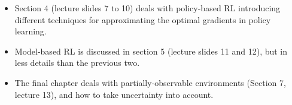 \begin{itemize}
	\item Section 4 (lecture slides 7 to 10) deals with policy-based RL introducing different techniques for approximating the optimal gradients in policy learning.
	\item Model-based RL is discussed in section 5 (lecture slides 11 and 12), but in less details than the previous two.
	\item The final chapter deals with partially-observable environments (Section 7, lecture 13), and how to take uncertainty into account.
\end{itemize}